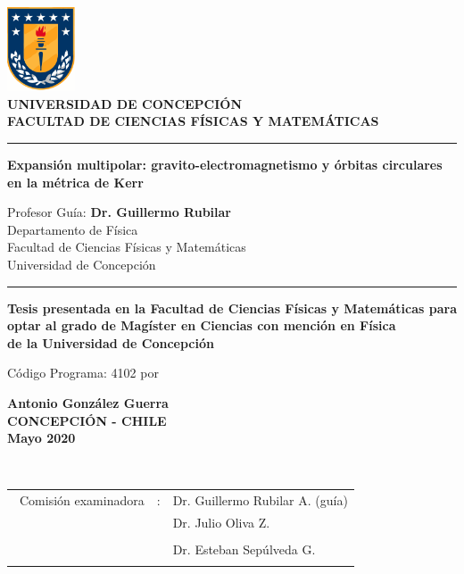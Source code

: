 \thispagestyle{empty}
\pagestyle{empty}
\begin{center}
	\includegraphics[width=2cm]{logo_udec}\\
	\vspace{0.3cm}
	\textbf{UNIVERSIDAD DE CONCEPCI\'ON} \\ 
	\textbf{FACULTAD DE CIENCIAS F\'ISICAS Y MATEM\'ATICAS} \\
	\vspace{0.6cm}	
	\rule{14.5cm}{0.1cm}
	\vspace{0.5cm}

	
	{\Large \textbf{Expansión multipolar: gravito-electromagnetismo y órbitas circulares en la métrica de Kerr}}
	
	\vspace{1.0cm}
	
	{ Profesor Gu\'ia: \textbf{Dr. Guillermo Rubilar}\\ 
		Departamento de F\'isica \\ 
		Facultad de Ciencias F\'isicas y Matem\'aticas \\
		Universidad de Concepci\'on}
	
	\vspace{0.7cm}
	\rule{14.5cm}{0.1cm}
	\vspace{0.35cm}	
	
	
\textbf{Tesis presentada en la Facultad de Ciencias F\'isicas y Matem\'aticas para optar al grado de Mag\'ister en Ciencias con menci\'on en F\'isica\\
de la Universidad de Concepci\'on}

C\'odigo Programa: 4102
	\vfill
	por
	
	\textbf{Antonio Gonz\'alez Guerra \\ 
	CONCEPCI\'ON -  CHILE \\
	Mayo 2020}
\end{center}

\thispagestyle{empty} 
\newpage

\pagestyle{myheadings}
\ \\
\vspace{10cm}
\vfill
\hspace{2.5cm}
\begin{tabular}[c]{lll}
	\ Comisi\'on examinadora & : & Dr. Guillermo Rubilar A. (gu\'ia)
	\bigskip
	\\
	\large & &  Dr. Julio Oliva Z. \\ \\
	& & Dr. Esteban Sep\'ulveda G.\\ \\
\end{tabular}
\thispagestyle{empty}